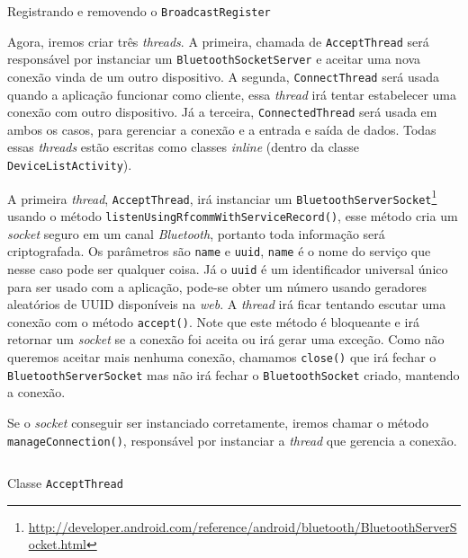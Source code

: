 \documentclass[a4paper,12pt,brazil,oneside]{book}
\begin{document}
\begin{singlespace}
	\begin{listing}[H]
	\inputminted[linenos=true,fontsize=\small,frame=lines, framesep=2mm, tabsize=2,numbersep=5pt]{java}{src/api/bluetooth/register.java}
	\caption{Registrando e removendo o \texttt{BroadcastRegister}}
	\label{code:bluetooth-registerbroadcast}
	\end{listing} 			

	Agora, iremos criar três \emph{threads}. A primeira, chamada de \texttt{AcceptThread} será responsável por instanciar um \texttt{BluetoothSocketServer} e aceitar uma nova conexão vinda de um outro dispositivo. A segunda, \texttt{ConnectThread} será usada quando a aplicação funcionar como cliente, essa \emph{thread} irá tentar estabelecer uma conexão com outro dispositivo. Já a terceira, \texttt{ConnectedThread} será usada em ambos os casos, para gerenciar a conexão e a entrada e saída de dados. Todas essas \emph{threads} estão escritas como classes \emph{inline} (dentro da classe \texttt{DeviceListActivity}).

	A primeira \emph{thread}, \texttt{AcceptThread}, irá instanciar um \texttt{BluetoothServerSocket}\footnote{\href{http://developer.android.com/reference/android/bluetooth/BluetoothServerSocket.html}{http://developer.android.com/reference/android/bluetooth/BluetoothServerSocket.html}}  usando o método \texttt{listenUsingRfcommWithServiceRecord()}, esse método cria um \emph{socket} seguro em um canal \emph{Bluetooth}, portanto toda informação será criptografada. Os parâmetros são \texttt{name} e \texttt{uuid}, \texttt{name} é o nome do serviço que nesse caso pode ser qualquer coisa. Já o \texttt{uuid} é um identificador universal único para ser usado com a aplicação, pode-se obter um número usando geradores aleatórios de UUID disponíveis na \emph{web}. A \emph{thread} irá ficar tentando escutar uma conexão com o método \texttt{accept()}. Note que este método é bloqueante e irá retornar um \emph{socket} se a conexão foi aceita ou irá gerar uma exceção.
Como não queremos aceitar mais nenhuma conexão, chamamos \texttt{close()} que irá fechar o \texttt{BluetoothServerSocket} mas não irá fechar o \texttt{BluetoothSocket} criado, mantendo a conexão.

Se o \emph{socket} conseguir ser instanciado corretamente, iremos chamar o método \\ \texttt{manageConnection()}, responsável por instanciar a \emph{thread} que gerencia a conexão. 

	\begin{listing}[H]
	\inputminted[linenos=true,fontsize=\small,frame=lines, framesep=2mm, tabsize=2,numbersep=5pt]{java}{src/api/bluetooth/acceptthread.java}
	\caption{Classe \texttt{AcceptThread}}
	\label{code:bluetooth-acceptthread}
	\end{listing} 			


\end{singlespace}
\end{document}
